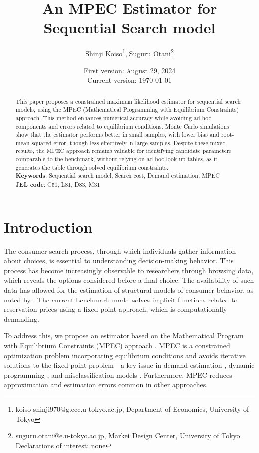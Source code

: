 \documentclass[12pt]{article}
\title{An MPEC Estimator for Sequential Search model}
\author{Shinji Koiso\thanks{koiso-shinji970@g.ecc.u-tokyo.ac.jp, Department of Economics, University of Tokyo}, Suguru Otani\thanks{suguru.otani@e.u-tokyo.ac.jp, Market Design Center, University of Tokyo\\Declarations of interest: none}}
\date{First version: August 29, 2024\\
Current version: \today}
\begin{document}
\maketitle

\begin{abstract}
\noindent
This paper proposes a constrained maximum likelihood estimator for sequential search models, using the MPEC (Mathematical Programming with Equilibrium Constraints) approach. This method enhances numerical accuracy while avoiding ad hoc components and errors related to equilibrium conditions. Monte Carlo simulations show that the estimator performs better in small samples, with lower bias and root-mean-squared error, though less effectively in large samples. Despite these mixed results, the MPEC approach remains valuable for identifying candidate parameters comparable to the benchmark, without relying on ad hoc look-up tables, as it generates the table through solved equilibrium constraints.
\\
\textbf{Keywords}: Sequential search model, Search cost, Demand estimation, MPEC \\
\textbf{JEL code}: C50, L81, D83, M31
\end{abstract}

\section{Introduction}

The consumer search process, through which individuals gather information about choices, is essential to understanding decision-making behavior. This process has become increasingly observable to researchers through browsing data, which reveals the options considered before a final choice. The availability of such data has allowed for the estimation of structural models of consumer behavior, as noted by \cite{ursu2023sequential}. The current benchmark model solves implicit functions related to reservation prices using a fixed-point approach, which is computationally demanding.

To address this, we propose an estimator based on the Mathematical Program with Equilibrium Constraints (MPEC) approach \citep{su2012constrained}. MPEC is a constrained optimization problem incorporating equilibrium conditions and avoids iterative solutions to the fixed-point problem—a key issue in demand estimation \citep{dube2012improving}, dynamic programming \citep{su2012constrained}, and misclassification models \citep{lu2014mpec}. Furthermore, MPEC reduces approximation and estimation errors common in other approaches.
\end{document}
